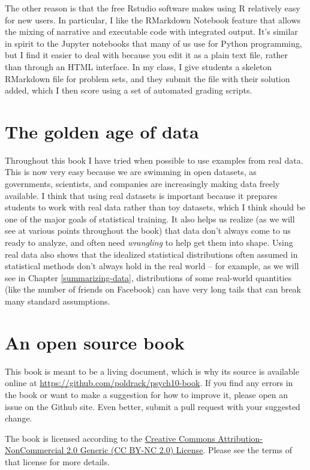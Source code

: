 \documentclass[]{book}
\theoremstyle{definition}
\theoremstyle{definition}
\theoremstyle{definition}
\theoremstyle{remark}
\begin{document}
The other reason is that the free Rstudio software makes using R
relatively easy for new users. In particular, I like the RMarkdown
Notebook feature that allows the mixing of narrative and executable code
with integrated output. It's similar in spirit to the Jupyter notebooks
that many of us use for Python programming, but I find it easier to deal
with because you edit it as a plain text file, rather than through an
HTML interface. In my class, I give students a skeleton RMarkdown file
for problem sets, and they submit the file with their solution added,
which I then score using a set of automated grading scripts.

\section{The golden age of data}\label{the-golden-age-of-data}

Throughout this book I have tried when possible to use examples from
real data. This is now very easy because we are swimming in open
datasets, as governments, scientists, and companies are increasingly
making data freely available. I think that using real datasets is
important because it prepares students to work with real data rather
than toy datasets, which I think should be one of the major goals of
statistical training. It also helps us realize (as we will see at
various points throughout the book) that data don't always come to us
ready to analyze, and often need \emph{wrangling} to help get them into
shape. Using real data also shows that the idealized statistical
distributions often assumed in statistical methods don't always hold in
the real world -- for example, as we will see in Chapter
\ref{summarizing-data}, distributions of some real-world quantities
(like the number of friends on Facebook) can have very long tails that
can break many standard assumptions.

\section{An open source book}\label{an-open-source-book}

This book is meant to be a living document, which is why its source is
available online at \url{https://github.com/poldrack/psych10-book}. If
you find any errors in the book or want to make a suggestion for how to
improve it, please open an issue on the Github site. Even better, submit
a pull request with your suggested change.

The book is licensed according to the
\href{https://creativecommons.org/licenses/by-nc/2.0/}{Creative Commons
Attribution-NonCommercial 2.0 Generic (CC BY-NC 2.0) License}. Please
see the terms of that license for more details.
\end{document}
